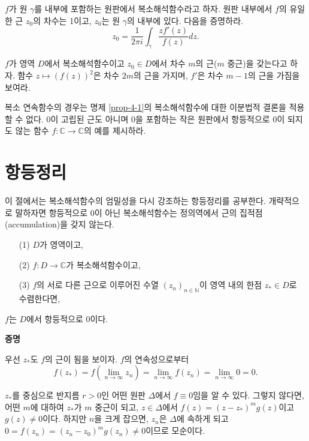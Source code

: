 \begin{salt_exercise} \label{ex-4-19}
$f$가 원 $\gamma$를 내부에 포함하는 원판에서 복소해석함수라고 하자.
원판 내부에서 $f$의 유일한 근 $z_0$의 차수는 1이고,
$z_0$는 원 $\gamma$의 내부에 있다.
다음을 증명하라.
\[
z_0 = \dfrac1{2\pi i} \int_\gamma \dfrac{zf'(z)}{f(z)} dz.
\]
\end{salt_exercise}

\begin{salt_exercise} \label{ex-4-20}
$f$가 영역 $D$에서 복소해석함수이고 $z_0\in D$에서
차수 $m$의 근($m$ 중근)을 갖는다고 하자.
함수 $z \mapsto (f(z))^2$은 차수 $2m$의 근을 가지며,
$f'$은 차수 $m-1$의 근을 가짐을 보여라.
\end{salt_exercise}

\begin{salt_exercise} \label{ex-4-21}
복소 연속함수의 경우는 명제 \ref{prop-4-1}의 복소해석함수에 대한
이분법적 결론을 적용할 수 없다. 
$0$이  고립된 근도 아니며 $0$을 포함하는 작은 원판에서  
항등적으로 $0$이 되지도 않는 함수 $f:\mathbb C \to \mathbb C$의 예를 제시하라.
\end{salt_exercise}

\section{항등정리}

이 절에서는 복소해석함수의 엄밀성을 다시 강조하는 항등정리를 공부한다.
개략적으로 말하자면
항등적으로 $0$이 아닌 복소해석함수는 정의역에서 근의 집적점(accumulation)을 갖지 않는다.

\begin{salttheorem}{}{} \label{thm-4-5}
\begin{itemize}
\item[(1)] $D$가 영역이고,
\item[(2)] $f:D\to\mathbb C$가 복소해석함수이고,
\item[(3)] $f$의 서로 다른 근으로 이루어진 수열 $(z_n)_{n\in\mathbb N}$이 
영역 내의 한점 $z_*\in D$로 수렴한다면,
\end{itemize}
$f$는 $D$에서 항등적으로 $0$이다.
\end{salttheorem}

{\bf 증명}

우선 $z_*$도 $f$의 근이 됨을 보이자.
$f$의 연속성으로부터
\[
f(z_*) = f\left(\lim_{n\to\infty} z_n \right) = \lim_{n\to\infty}f( z_n) 
= \lim_{n\to\infty} 0 = 0.
\]

$z_*$를 중심으로 반지름 $r>0$인 어떤 원판 $\Delta$에서 $f\equiv0$임을 알 수 있다.
그렇지 않다면, 어떤 $m$에 대하여 $z_*$가 $m$ 중근이 되고,
$z\in \Delta$에서
$f(z)=(z-z_*)^mg(z)$이고 $g(z)\ne0$이다.
하지만 $n$을 크게 잡으면, $z_n$은 $\Delta$에 속하게 되고
$0 = f(z_n) = (z_n-z_0)^m g(z_n) \ne 0$이므로 모순이다.


